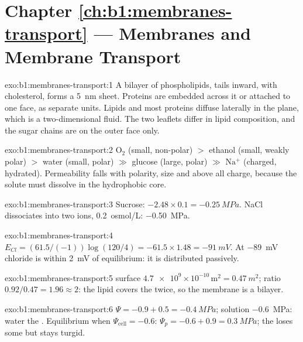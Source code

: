 \section*{Chapter \ref{ch:b1:membranes-transport} --- Membranes and Membrane Transport}

\begin{solution}{exo:b1:membranes-transport:1}
A bilayer of phospholipids, tails inward, with cholesterol, forms a
\qty{5}{nm} sheet. Proteins are embedded across it or attached to one
face, as separate units. Lipids and most proteins diffuse laterally in
the plane, which is a two-dimensional fluid. The two leaflets differ
in lipid composition, and the sugar chains are on the outer face only.
\end{solution}

\begin{solution}{exo:b1:membranes-transport:2}
$\mathrm{O_2}$ (small, non-polar) $>$ ethanol (small, weakly polar)
$>$ water (small, polar) $\gg$ glucose (large, polar) $\gg$
$\mathrm{Na^+}$ (charged, hydrated). Permeability falls with polarity,
size and above all charge, because the solute must dissolve in the
hydrophobic core.
\end{solution}

\begin{solution}{exo:b1:membranes-transport:3}
Sucrose: $-2.48\times 0.1 = \qty{-0.25}{MPa}$. NaCl dissociates into
two ions, \qty{0.2}{osmol/L}: \qty{-0.50}{MPa}.
\end{solution}

\begin{solution}{exo:b1:membranes-transport:4}
$E_{Cl} = (61.5/(-1))\log(120/4) = -61.5\times 1.48 = \qty{-91}{mV}$.
At \qty{-89}{mV} chloride is within \qty{2}{mV} of equilibrium: it is
distributed passively.
\end{solution}

\begin{solution}{exo:b1:membranes-transport:5}
 surface $\num{4.7e9}\times 10^{-10}\,\mathrm{m^2} =
\qty{0.47}{m^2}$; ratio $0.92/0.47 = 1.96 \approx 2$: the lipid covers
the  twice, so the membrane is a bilayer.
\end{solution}

\begin{solution}{exo:b1:membranes-transport:6}
 $\Psi = -0.9 + 0.5 = \qty{-0.4}{MPa}$; solution \qty{-0.6}{MPa}:
water  the . Equilibrium when $\Psi_{\text{cell}} = -0.6$:
$\Psi_p = -0.6 + 0.9 = \qty{0.3}{MPa}$; the  loses some  but
stays turgid.
\end{solution}


